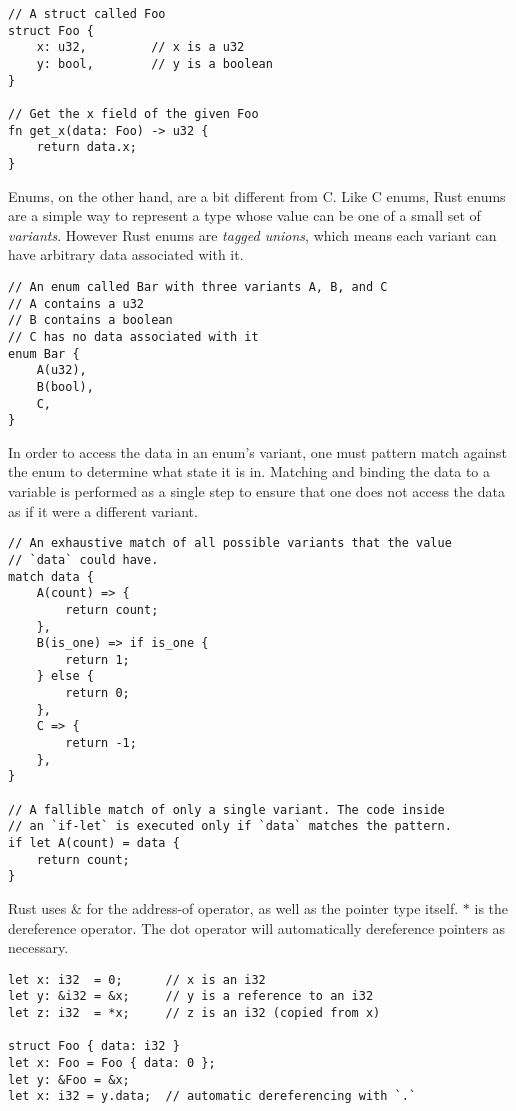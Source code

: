 \begin{verbatim}
// A struct called Foo
struct Foo {
    x: u32,         // x is a u32
    y: bool,        // y is a boolean
}

// Get the x field of the given Foo
fn get_x(data: Foo) -> u32 {
    return data.x;
}
\end{verbatim}

Enums, on the other hand, are a bit different from C.
Like C enums, Rust enums are a simple way to represent a type whose value can be
one of a small set of \emph{variants}. However Rust enums are
\emph{tagged unions}, which means each variant can have arbitrary data associated
with it.

\begin{verbatim}
// An enum called Bar with three variants A, B, and C
// A contains a u32
// B contains a boolean
// C has no data associated with it
enum Bar {
    A(u32),
    B(bool),
    C,
}
\end{verbatim}

In order to access the data in an enum's variant, one must pattern match against
the enum to determine what state it is in. Matching and binding the data to a variable
is performed as a single step to ensure that one does not access the data as if it
were a different variant.

\begin{verbatim}
// An exhaustive match of all possible variants that the value
// `data` could have.
match data {
    A(count) => {
        return count;
    },
    B(is_one) => if is_one {
        return 1;
    } else {
        return 0;
    },
    C => {
        return -1;
    },
}

// A fallible match of only a single variant. The code inside
// an `if-let` is executed only if `data` matches the pattern.
if let A(count) = data {
    return count;
}
\end{verbatim}

Rust uses $\&$ for the address-of operator, as well as the pointer type
itself. $*$ is the dereference operator. The dot operator will automatically
dereference pointers as necessary.

\begin{verbatim}
let x: i32  = 0;      // x is an i32
let y: &i32 = &x;     // y is a reference to an i32
let z: i32  = *x;     // z is an i32 (copied from x)

struct Foo { data: i32 }
let x: Foo = Foo { data: 0 };
let y: &Foo = &x;
let x: i32 = y.data;  // automatic dereferencing with `.`

\end{verbatim}


